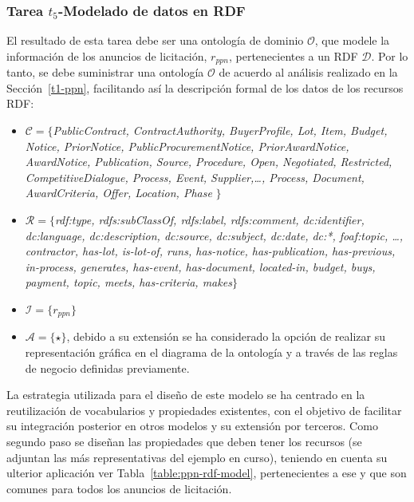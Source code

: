 \subsubsection{Tarea $t_5$-Modelado de datos en RDF}
El resultado de esta tarea debe ser una ontología de dominio $\mathcal{O}$, que modele la información 
de los anuncios de licitación, $r_{ppn}$, pertenecientes a un \dataset RDF $\mathcal{D}$. Por lo tanto, se debe 
suministrar una ontología $\mathcal{O}$ de acuerdo al análisis realizado en la Sección~\ref{t1-ppn}, facilitando 
así la descripción formal de los datos de los recursos \gls{RDF}:
% 
 \begin{itemize}
  \item $\mathcal{C} = \{$\textit{PublicContract, ContractAuthority, BuyerProfile, Lot, Item, Budget, Notice, PriorNotice, PublicProcurementNotice, PriorAwardNotice, AwardNotice, Publication, Source, Procedure, Open, Negotiated, Restricted, CompetitiveDialogue, Process, 
Event, Supplier,\ldots, Process, Document, AwardCriteria, Offer, Location, Phase }$\}$
  \item $\mathcal{R} = \{$\textit{rdf:type, rdfs:subClassOf, rdfs:label, rdfs:comment, dc:identifier, dc:language, dc:description, dc:source, dc:subject, dc:date, dc:*, foaf:topic, 
\ldots, contractor, has-lot, is-lot-of, runs, has-notice, has-publication, has-previous, in-process, 
generates, has-event, has-document, located-in, budget, buys, payment, topic, meets, has-criteria, makes}$\}$
  \item $\mathcal{I} = \{ r_{ppn} \}$
  \item $\mathcal{A} = \{\star\}$, debido a su extensión se ha considerado la opción de realizar su representación 
gráfica en el diagrama de la ontología y a través de las reglas de negocio definidas previamente.
 \end{itemize}
%  
\cleardoublepage
La estrategia utilizada para el diseño de este modelo se ha centrado en la reutilización de vocabularios y propiedades 
existentes, con el objetivo de facilitar su integración posterior en otros modelos y su extensión por terceros. Como segundo paso 
se diseñan las propiedades que deben tener los recursos (se adjuntan las más representativas del ejemplo en curso), teniendo en cuenta su ulterior aplicación ver 
Tabla~\ref{table:ppn-rdf-model},  pertenecientes a ese \dataset y que son comunes para todos los anuncios de licitación.
% 
